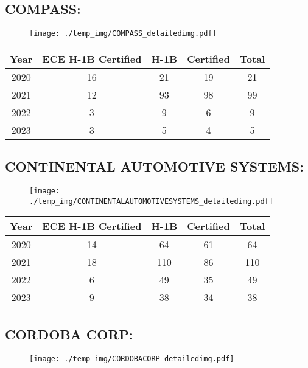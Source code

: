 \documentclass{article}%
\begin{document}
%
\newpage%
\subsection{COMPASS:}%
\label{subsec:COMPASS}%
\label{COMPASSdetailed}%


\begin{figure}[htbp]%
\centering%
\texttt{[image: ./temp\_img/COMPASS\_detailedimg.pdf]}%
\end{figure}

%
\begin{longtable}{c|c|c|c|c}%
\hline%
Year&ECE H{-}1B Certified&H{-}1B&Certified&Total\\%
\hline%
2020&16&21&19&21\\%
\hline%
2021&12&93&98&99\\%
\hline%
2022&3&9&6&9\\%
\hline%
2023&3&5&4&5\\%
\hline%
\end{longtable}

%
\newpage%
\subsection{CONTINENTAL AUTOMOTIVE SYSTEMS:}%
\label{subsec:CONTINENTALAUTOMOTIVESYSTEMS}%
\label{CONTINENTALAUTOMOTIVESYSTEMSdetailed}%


\begin{figure}[htbp]%
\centering%
\texttt{[image: ./temp\_img/CONTINENTALAUTOMOTIVESYSTEMS\_detailedimg.pdf]}%
\end{figure}

%
\begin{longtable}{c|c|c|c|c}%
\hline%
Year&ECE H{-}1B Certified&H{-}1B&Certified&Total\\%
\hline%
2020&14&64&61&64\\%
\hline%
2021&18&110&86&110\\%
\hline%
2022&6&49&35&49\\%
\hline%
2023&9&38&34&38\\%
\hline%
\end{longtable}

%
\newpage%
\subsection{CORDOBA CORP:}%
\label{subsec:CORDOBACORP}%
\label{CORDOBACORPdetailed}%


\begin{figure}[htbp]%
\centering%
\texttt{[image: ./temp\_img/CORDOBACORP\_detailedimg.pdf]}%
\end{figure}
\end{document}
